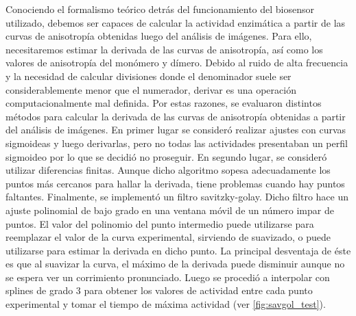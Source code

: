 Conociendo el formalismo teórico detrás del funcionamiento del biosensor utilizado, debemos ser capaces de calcular la actividad enzimática a partir de las curvas de anisotropía obtenidas luego del análisis de imágenes. Para ello, necesitaremos estimar la derivada de las curvas de anisotropía, así como los valores de anisotropía del monómero y dímero. Debido al ruido de alta frecuencia y la necesidad de calcular divisiones donde el denominador suele ser considerablemente menor que el numerador, derivar es una operación computacionalmente mal definida. Por estas razones, se evaluaron distintos métodos para calcular la derivada de las curvas de anisotropía obtenidas a partir del análisis de imágenes. En primer lugar se consideró realizar ajustes con curvas sigmoideas y luego derivarlas, pero no todas las actividades presentaban un perfil sigmoideo por lo que se decidió no proseguir. En segundo lugar, se consideró utilizar diferencias finitas. Aunque dicho algoritmo sopesa adecuadamente los puntos más cercanos para hallar la derivada, tiene problemas cuando hay puntos faltantes. Finalmente, se implementó un filtro savitzky-golay. Dicho filtro hace un ajuste polinomial de bajo grado en una ventana móvil de un número impar de puntos. El valor del polinomio del punto intermedio puede utilizarse para reemplazar el valor de la curva experimental, sirviendo de suavizado, o puede utilizarse para estimar la derivada en dicho punto. La principal desventaja de éste es que al suavizar la curva, el máximo de la derivada puede disminuir aunque no se espera ver un corrimiento pronunciado. Luego se procedió a interpolar con splines de grado 3 para obtener los valores de actividad entre cada punto experimental y tomar el tiempo de máxima actividad (ver \cref{fig:savgol_test}).

